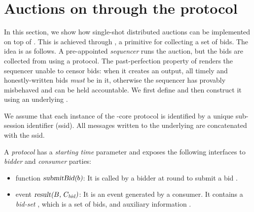 \section{Auctions on \podtm through the \bidsettm protocol}\label{sec:auctions}
In this section, we show how single-shot distributed auctions can be implemented on top of \podtm.
This is achieved through \bidsettm, a primitive for collecting a set of bids.
The idea is as follows. A pre-appointed \emph{sequencer} runs the auction, but the bids are collected from \podtm using a \bidsettm protocol. The past-perfection property of \podtm renders the sequencer unable to censor bids: when it creates an output, all timely and honestly-written bids \emph{must} be in it, otherwise the sequencer has provably misbehaved and can be held accountable.
We first define \bidsettm and then construct it using an underlying \podtm.

\begin{remark}
	We assume that each instance of the \bidsettm-core protocol is identified by a unique sub-session identifier (ssid). All messages written to the underlying \podtm are concatenated with the ssid.
\end{remark}


\begin{definition}\label{def:auction-framework}
    A \bidsettm \emph{protocol} has a \emph{starting time} parameter \tzero and exposes the following interfaces to \emph{bidder} and \emph{consumer} parties:
    \begin{itemize}
        \item function $\textsl{submitBid(\ensuremath{b})}$: It is called by a bidder at round \tzero to submit a bid \bid.
        \item event $\textsl{result(\ensuremath{B}, \ensuremath{C_\text{bid}})}$: It is an event generated by a consumer. It contains a \emph{bid-set} \bag, which is a set of bids, and auxiliary information \bidcert.
    \end{itemize}
\end{definition}

